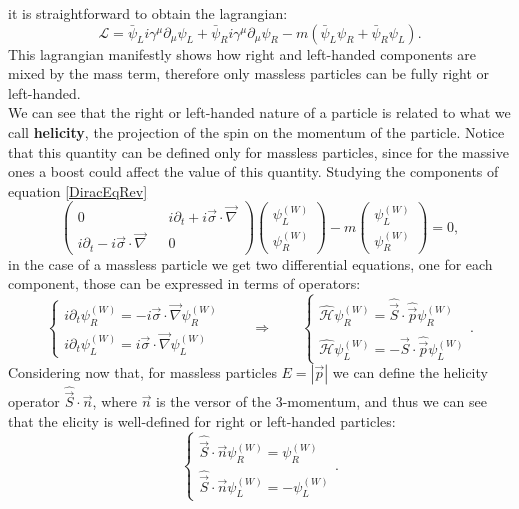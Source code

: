  it is straightforward to obtain the lagrangian:
\begin{equation}
    \mathcal{L} =\bar\psi_{L}i\gamma^\mu\partial_\mu\psi_{L}+\bar\psi_{R}i\gamma^\mu\partial_\mu\psi_{R}-m(\bar\psi_{L}\psi_{R}+\bar\psi_{R}\psi_{L}).
\end{equation}
This lagrangian manifestly shows how right and left-handed components are mixed by the mass term, therefore only massless particles can be fully right or left-handed.\\ We can see that the right or left-handed nature of a particle is related to what we call \textbf{helicity}, the projection of the spin on the momentum of the particle. Notice that this quantity can be defined only for massless particles, since for the massive ones a boost could affect the value of this quantity. Studying the components of equation \eqref{DiracEqRev}
\begin{equation*}
    \begin{pmatrix}
        0&&i\partial_t+i\vec\sigma\cdot\vec\nabla\\i\partial_t-i\vec\sigma\cdot\vec\nabla&&0
    \end{pmatrix}\begin{pmatrix}
        \psi_L^{(W)}\\\psi_{R}^{(W)}
    \end{pmatrix}-m\begin{pmatrix}
        \psi_L^{(W)}\\\psi_{R}^{(W)}
    \end{pmatrix}=0,
\end{equation*}
in the case of a massless particle we get two differential equations, one for each component, those can be expressed in terms of operators:
\begin{equation*}
    \begin{cases}
        i\partial_t\psi_{R}^{(W)}=-i\vec\sigma\cdot\vec\nabla\psi_{R}^{(W)}\\
        i\partial_t\psi_{L}^{(W)}=i\vec\sigma\cdot\vec\nabla\psi_{L}^{(W)}
    \end{cases}\qquad\Rightarrow\qquad
    \begin{cases}
        \hat{\mathcal{H}} \psi_{R}^{(W)}=\hat{\vec{S}}\cdot\hat{\vec{ p}}\psi_{R}^{(W)}\\
        \hat{\mathcal{H}}\psi_{L}^{(W)}=-\hat{\vec{S}}\cdot\hat{\vec{ p}}\psi_{L}^{(W)}
    \end{cases}.
\end{equation*}
Considering now that, for massless particles $E=|\vec p|$ we can define the helicity operator $\hat{\vec{S}}\cdot\vec{n}$, where $ \vec{n}$ is the versor of the 3-momentum, and thus we can see that the elicity is well-defined for right or left-handed particles:
\begin{equation*}
    \begin{cases}
        \hat{\vec{S}}\cdot\vec{n}\psi_{R}^{(W)}=\psi_{R}^{(W)}\\
        \hat{\vec{S}}\cdot\vec{n}\psi_{L}^{(W)}=-\psi_{L}^{(W)}
    \end{cases}.
\end{equation*}
